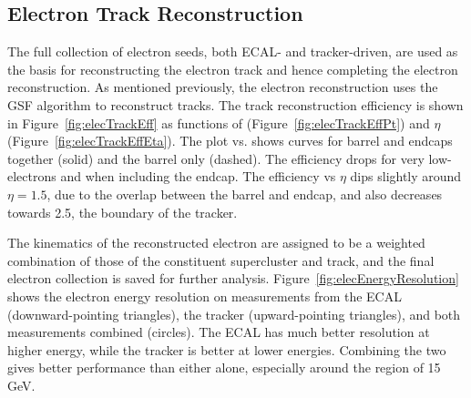 \subsection{Electron Track Reconstruction}
\label{evReco:elecTrk}

The full collection of electron seeds, 
both ECAL- and tracker-driven, 
are used as the basis for reconstructing 
the electron track and hence 
completing the electron reconstruction.  
As mentioned previously, 
the electron reconstruction uses the 
GSF algorithm to reconstruct tracks.  
The track reconstruction efficiency is shown 
in Figure~\ref{fig:elecTrackEff} 
as functions of \pt (Figure~\ref{fig:elecTrackEffPt}) 
and $\eta$ (Figure~\ref{fig:elecTrackEffEta}). 
The plot vs. \pt shows curves for 
barrel and endcaps together (solid) 
and the barrel only (dashed).  
The efficiency drops for very low-\pt electrons 
and when including the endcap. 
The efficiency vs $\eta$ dips slightly 
around $\eta = 1.5$, 
due to the overlap between the barrel and endcap, 
and also decreases towards 2.5, 
the boundary of the tracker.  

The kinematics of the reconstructed electron are 
assigned to be a weighted combination 
of those of the constituent supercluster 
and track, 
and the final electron collection 
is saved for further analysis.  
Figure~\ref{fig:elecEnergyResolution} 
shows the electron energy resolution 
on measurements from the ECAL (downward-pointing triangles), 
the tracker (upward-pointing triangles), 
and both measurements combined (circles).  
The ECAL has much better resolution at higher energy, 
while the tracker is better at lower energies.  
Combining the two gives better performance than 
either alone, especially around the region of 15 GeV.  

